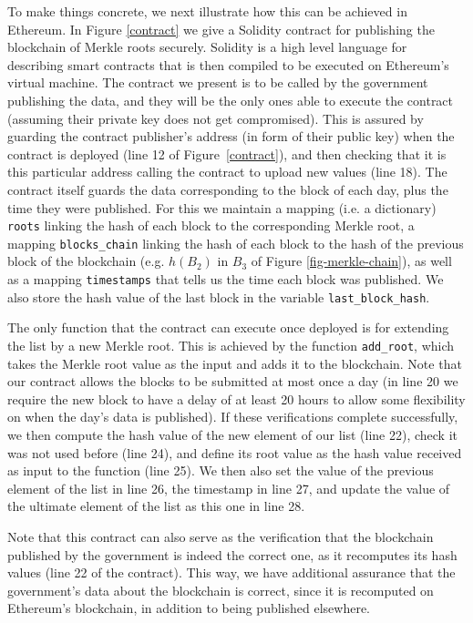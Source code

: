 To make things concrete, we next illustrate how this can be achieved in Ethereum. In Figure \ref{contract} we give a Solidity contract for publishing the blockchain of Merkle roots securely. Solidity \cite{Solidity} is a high level language for describing smart contracts that is then compiled to be executed on Ethereum's virtual machine. The contract we present is to be called by the government publishing the data, and they will be the only ones able to execute the contract (assuming their private key does not get compromised). This is assured by guarding the contract publisher's address (in form of their public key) when the contract is deployed (line 12 of Figure~\ref{contract}), and then checking that it is this particular address calling the contract to upload new values (line 18). The contract itself guards the data corresponding to the block of each day, plus the time they were published. For this we maintain a mapping (i.e. a dictionary) \texttt{roots} linking the hash of each block to the corresponding Merkle root, a mapping \texttt{blocks\_chain} linking the hash of each block to the hash of the previous block of the blockchain (e.g. $h(B_2)$ in $B_3$ of Figure \ref{fig-merkle-chain}), as well as a mapping \texttt{timestamps} that tells us the time each block was published. We also store the hash value of the last block in the variable \texttt{last\_block\_hash}.

The only function that the contract can execute once deployed is for extending the list by a new Merkle root. This is achieved by the function \texttt{add\_root}, which takes the Merkle root value as the input and adds it to the blockchain. Note that our contract allows the blocks to be submitted at most once a day (in line 20 we require the new block to have a delay of at least 20 hours to allow some flexibility on when the day's data is published). If these verifications complete successfully, we then compute the hash value of the new element of our list (line 22), check it was not used before (line 24), and define its root value as the hash value received as input to the function (line 25). We then also set the value of the previous element of the list in line 26, the timestamp in line 27, and update the value of the ultimate element of the list as this one in line 28.

Note that this contract can also serve as the verification that the blockchain published by the government is indeed the correct one, as it recomputes its hash values (line 22 of the contract). This way, we have additional assurance that the government's data about the blockchain is correct, since it is recomputed on Ethereum's blockchain, in addition to being published elsewhere.

